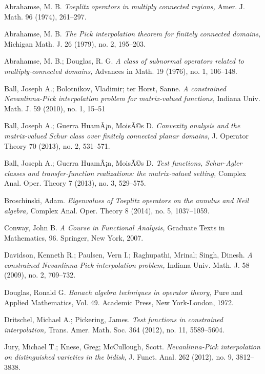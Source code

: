 \documentclass[12pt]{amsart}
\theoremstyle{definition}
\theoremstyle{remark}
\numberwithin{equation}{section}
\begin{document}
\begin{thebibliography}{99}
  Abrahamse, M. B. {\it Toeplitz operators in multiply connected regions,} Amer. J. Math. 96 (1974), 261--297.

  Abrahamse, M. B. {\it The Pick interpolation theorem for finitely connected domains,}  Michigan Math. J. 26 (1979), no. 2, 195--203.

  Abrahamse, M. B.; Douglas, R. G. {\it A class of subnormal operators related to multiply-connected domains,} Advances in Math. 19 (1976), no. 1, 106--148.

 Ball, Joseph A.; Bolotnikov, Vladimir; ter Horst, Sanne. {\it A constrained Nevanlinna-Pick interpolation problem for matrix-valued functions,} Indiana Univ. Math. J. 59 (2010), no. 1, 15--51

  Ball, Joseph A.; Guerra HuamÃ¡n, MoisÃ©s D.
{\it  Convexity analysis and the matrix-valued Schur class over finitely connected planar domains,}
 J. Operator Theory 70 (2013), no. 2, 531--571.

  Ball, Joseph A.; Guerra HuamÃ¡n, MoisÃ©s D. 
{\it Test functions, Schur-Agler classes and transfer-function realizations: the matrix-valued setting,}
 Complex Anal. Oper. Theory 7 (2013), no. 3, 529--575.

 Broschinski, Adam. {\it Eigenvalues of Toeplitz operators on the annulus and Neil algebra,} Complex Anal. Oper. Theory 8 (2014), no. 5, 1037--1059.

 Conway, John B. {\it A Course in Functional Analysis,} 
Graduate Texts in Mathematics, 96. Springer, New York, 2007.

  Davidson, Kenneth R.; Paulsen, Vern I.; Raghupathi, Mrinal; Singh, Dinesh. {\it A constrained Nevanlinna-Pick interpolation problem,} Indiana Univ. Math. J. 58 (2009), no. 2, 709--732. 

 Douglas, Ronald G. 
{\it Banach algebra techniques in operator theory,}
 Pure and Applied Mathematics, Vol. 49. Academic Press, New York-London, 1972.

 Dritschel, Michael A.; Pickering, James. {\it Test functions in constrained interpolation,} Trans. Amer. Math. Soc. 364 (2012), no. 11, 5589--5604.

 Jury, Michael T.; Knese, Greg; McCullough, Scott. {\it Nevanlinna-Pick interpolation on distinguished varieties in the bidisk,} J. Funct. Anal. 262 (2012), no. 9, 3812--3838.


\end{thebibliography}
\end{document}
